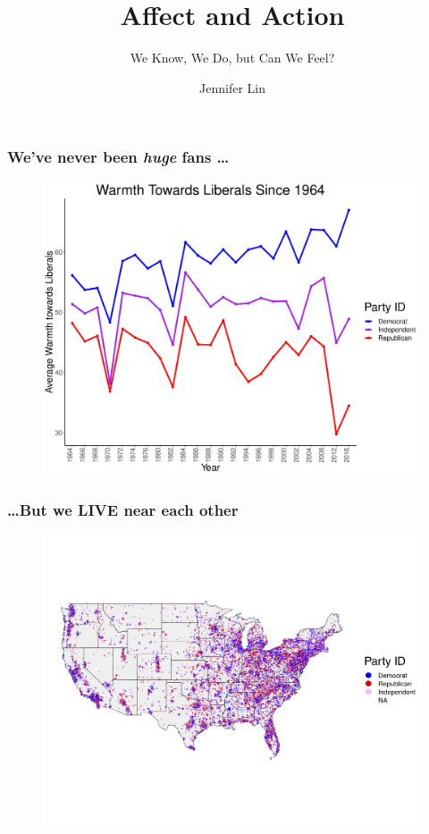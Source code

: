 \documentclass[14pt]{beamer}
\newcommand\e{\emph}
\begin{document}
	\author{Jennifer Lin}
	\title{Affect and Action}
	\subtitle{We Know, We Do, but Can We Feel?}
	\begin{frame}[plain]
	\maketitle
\end{frame}



\begin{frame}
\frametitle{We've never been \e{huge} fans \ldots}
\begin{center}
	\begin{figure}[ht!]  
		{	 \includegraphics[width=.9\textwidth]{Liberals}}
	\end{figure}
\end{center}
\end{frame}

\begin{frame}
\frametitle{\ldots But we LIVE near each other}
\begin{center}
	\begin{figure}[ht!]  
		{	 \includegraphics[width=\textwidth]{USMap}}
	\end{figure}
\end{center}
\end{frame}
\end{document}
